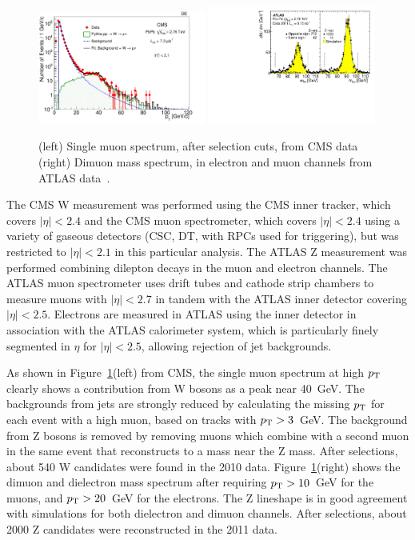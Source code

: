 \begin{figure}[t]
\begin{center}
\includegraphics[width=0.49\textwidth]{electroweak_figs/Fig1a.pdf}
\includegraphics[width=0.49\textwidth]{electroweak_figs/fig_01.pdf}
\caption[]{(left) Single muon spectrum, after selection cuts, from CMS data~\cite{Chatrchyan:2012nt} (right) Dimuon mass spectrum, in electron and muon channels from ATLAS data~\cite{Aad:2012ew}.}
\label{fig:pas:zw_signal}
\end{center}
\end{figure}
The CMS W measurement was performed using the CMS inner tracker, which covers $|\eta|<2.4$
and the CMS muon spectrometer, which covers $|\eta|<2.4$ using a variety of gaseous detectors
(CSC, DT, with RPCs used for triggering), but was restricted to $|\eta|<2.1$ in this particular analysis.
The ATLAS Z measurement was performed combining dilepton decays in the muon and electron channels.
The ATLAS muon spectrometer uses drift tubes and cathode strip chambers to measure muons with $|\eta|<2.7$
in tandem with the ATLAS inner detector covering $|\eta|<2.5$.
Electrons are measured in ATLAS using the inner detector in association with the ATLAS calorimeter system,
which is particularly finely segmented in $\eta$ for $|\eta|<2.5$, allowing rejection of jet backgrounds.

As shown in Figure~\ref{fig:pas:zw_signal}(left) from CMS, the single muon spectrum at high $\mbox{$p_{\mathrm{T}}$}$ clearly shows a contribution
from W bosons as a peak near 40~GeV.
The backgrounds from jets are strongly reduced by calculating the missing $\mbox{$p_{\mathrm{T}}$}$ for each event with a
high \pT muon, based on tracks with $\mbox{$p_{\mathrm{T}}$}>3$~GeV.  The background from Z bosons is removed by removing muons which
combine with a second muon in the same event that reconstructs to a mass near the Z mass.
After selections, about 540 W candidates were found in the 2010 \PbPb data.
%
Figure~\ref{fig:pas:zw_signal}(right) shows the dimuon and dielectron mass spectrum after requiring $\mbox{$p_{\mathrm{T}}$}>10$~GeV for
the muons, and $\mbox{$p_{\mathrm{T}}$}>20$~GeV for the electrons.  The Z lineshape is in good agreement with simulations for both
dielectron and dimuon channels.
After selections, about 2000 Z candidates were reconstructed in the 2011 \PbPb data.

